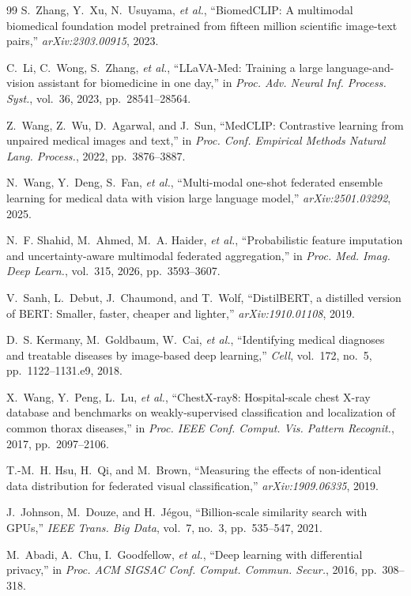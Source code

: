 \documentclass[letterpaper, conference]{IEEEtran}
\begin{document}
\begin{thebibliography}{99}
S.~Zhang, Y.~Xu, N.~Usuyama, \emph{et al.}, ``BiomedCLIP: A multimodal biomedical
foundation model pretrained from fifteen million scientific image-text pairs,''
\emph{arXiv:2303.00915}, 2023.

C.~Li, C.~Wong, S.~Zhang, \emph{et al.}, ``LLaVA-Med: Training a large
language-and-vision assistant for biomedicine in one day,'' in \emph{Proc. Adv.
Neural Inf. Process. Syst.}, vol.~36, 2023, pp.~28541--28564.

Z.~Wang, Z.~Wu, D.~Agarwal, and J.~Sun, ``MedCLIP: Contrastive learning from
unpaired medical images and text,'' in \emph{Proc. Conf. Empirical Methods Natural
Lang. Process.}, 2022, pp.~3876--3887.

N.~Wang, Y.~Deng, S.~Fan, \emph{et al.}, ``Multi-modal one-shot federated ensemble
learning for medical data with vision large language model,''
\emph{arXiv:2501.03292}, 2025.

N.~F. Shahid, M.~Ahmed, M.~A. Haider, \emph{et al.}, ``Probabilistic feature
imputation and uncertainty-aware multimodal federated aggregation,'' in \emph{Proc.
Med. Imag. Deep Learn.}, vol.~315, 2026, pp.~3593--3607.

V.~Sanh, L.~Debut, J.~Chaumond, and T.~Wolf, ``DistilBERT, a distilled version of
BERT: Smaller, faster, cheaper and lighter,'' \emph{arXiv:1910.01108}, 2019.

D.~S. Kermany, M.~Goldbaum, W.~Cai, \emph{et al.}, ``Identifying medical diagnoses
and treatable diseases by image-based deep learning,'' \emph{Cell}, vol.~172,
no.~5, pp.~1122--1131.e9, 2018.

X.~Wang, Y.~Peng, L.~Lu, \emph{et al.}, ``ChestX-ray8: Hospital-scale chest X-ray
database and benchmarks on weakly-supervised classification and localization of
common thorax diseases,'' in \emph{Proc. IEEE Conf. Comput. Vis. Pattern
Recognit.}, 2017, pp.~2097--2106.

T.-M.~H. Hsu, H.~Qi, and M.~Brown, ``Measuring the effects of non-identical data
distribution for federated visual classification,'' \emph{arXiv:1909.06335}, 2019.

J.~Johnson, M.~Douze, and H.~J\'egou, ``Billion-scale similarity search with
GPUs,'' \emph{IEEE Trans. Big Data}, vol.~7, no.~3, pp.~535--547, 2021.

M.~Abadi, A.~Chu, I.~Goodfellow, \emph{et al.}, ``Deep learning with differential
privacy,'' in \emph{Proc. ACM SIGSAC Conf. Comput. Commun. Secur.}, 2016,
pp.~308--318.


\end{thebibliography}
\end{document}
